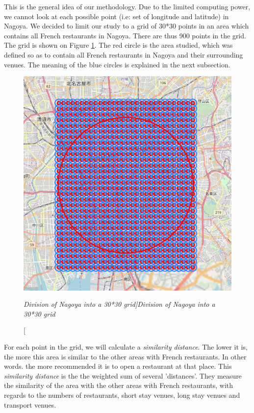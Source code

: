 \documentclass[12pt,a4paper]{article}
\begin{document}
\medskip

This is the general idea of our methodology. Due to the limited computing power, we cannot look at each possible point (i.e: set of longitude and latitude) in Nagoya. We decided to limit our study to a grid of 30*30 points in an area which contains all French restaurants in Nagoya. There are thus 900 points in the grid. The grid is shown on Figure \ref{nagoya_grid}. The red circle is the area studied, which was defined so as to contain all French restaurants in Nagoya and their surrounding venues. The meaning of the blue circles is explained in the next subsection. 

\begin{figure}[ht]
	\begin{center}
			  \includegraphics[width=15cm]{nagoya_grid.png}
	\end{center}
	\caption [\itshape Division of Nagoya into a 30*30 grid]{\itshape Division of Nagoya into a 30*30 grid}	
	\label{nagoya_grid}
\end{figure}

\medskip

For each point in the grid, we will calculate a \textit{similarity distance}. The lower it is, the more this area is similar to the other areas with French restaurants. In other words. the more recommended it is to open a restaurant at that place. This \textit{similarity distance} is the the weighted sum of several 'distances'. They measure the similarity of the area with the other areas with French restaurants, with regards to the numbers of restaurants, short stay venues, long stay venues and transport venues.
\end{document}
